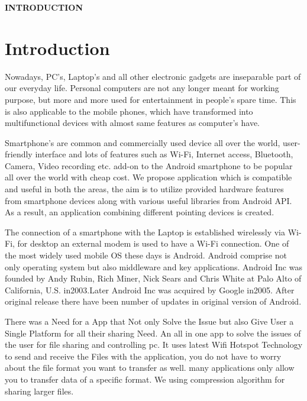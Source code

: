 \documentclass[12pt]{article}
\begin{document}
\clearpage

	
\begin{center}
 
 \Large \textbf{INTRODUCTION}\\[10mm]
 \end{center}
 \section{Introduction}\par
Nowadays, PC’s, Laptop’s and all other electronic gadgets are inseparable part of  our everyday life. Personal computers are not any longer meant for working  purpose, but more and more used for entertainment in people’s spare time. This is also applicable to the mobile phones, which have transformed into multifunctional devices with almost same features as computer’s have. \par
Smartphone's are common and commercially used device all over the world, user-
friendly interface and lots of features such as Wi-Fi, Internet access, Bluetooth,
Camera, Video recording etc. add-on to the Android smartphone to be popular all
over the world with cheap cost. We propose application which is compatible and
useful in both the areas, the aim is to utilize provided hardware features from
smartphone devices along with various useful libraries from Android API. As a
result, an application combining different pointing devices is created.\par 
The connection of a smartphone with the Laptop is established wirelessly via Wi-
Fi, for desktop an external modem is used to have a Wi-Fi connection. One of the
most widely used mobile OS these days is Android. Android comprise not only
operating system but also middleware and key applications. Android Inc was
founded by Andy Rubin, Rich Miner, Nick Sears and Chris White at Palo Alto of
California, U.S. in2003.Later Android Inc was acquired by Google in2005. After
original release there have been number of updates in original version of Android.\\[2mm]\par
There was a Need for a App that Not only Solve the Issue but also Give User a
Single Platform for all their sharing Need. An all in one app to solve the issues of
the user for file sharing and controlling pc. It uses latest Wifi Hotspot Technology
to send and receive the Files with the application, you do not have to worry about
the file format you want to transfer as well. many applications only allow you to
transfer data of a specific format. We using compression algorithm for sharing
larger files.\\[10mm]\par
\end{document}
